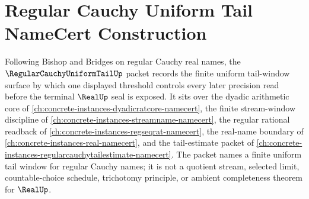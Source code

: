 \chapter{Regular Cauchy Uniform Tail NameCert Construction}
\label{ch:concrete-instances-regular-cauchy-uniform-tail-namecert}

Following Bishop and Bridges on regular Cauchy real names, the $\RegularCauchyUniformTailUp$ packet records the finite uniform tail-window surface by which one displayed threshold controls every later precision read before the terminal $\RealUp$ seal is exposed. It sits over the dyadic arithmetic core of \autoref{ch:concrete-instances-dyadicratcore-namecert}, the finite stream-window discipline of \autoref{ch:concrete-instances-streamname-namecert}, the regular rational readback of \autoref{ch:concrete-instances-regseqrat-namecert}, the real-name boundary of \autoref{ch:concrete-instances-real-namecert}, and the tail-estimate packet of \autoref{ch:concrete-instances-regularcauchytailestimate-namecert}. The packet names a finite uniform tail window for regular Cauchy names; it is not a quotient stream, selected limit, countable-choice schedule, trichotomy principle, or ambient completeness theorem for $\RealUp$.


